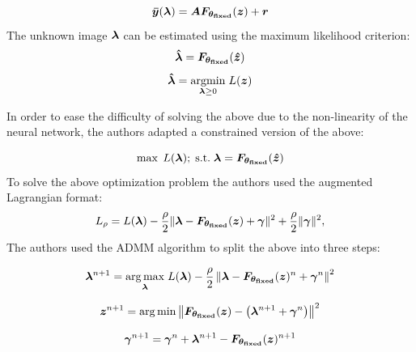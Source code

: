 \begin{equation}\label{eq:mod_PET}
	\bm{\bar{y}}(\bm{\lambda}) = \bm{A} \bm{F}_{\bm{\theta_{\mathrm{fixed}}}}(\bm{z}) + \bm{r}
\end{equation}
The unknown image $\bm{\lambda}$ can be estimated using the maximum likelihood criterion:
\begin{equation}\label{eq:iter_CNN2}
\bm{\hat{\lambda}} = \bm{F}_{\bm{\theta_{\mathrm{fixed}}}}(\bm{\hat{z}})
\end{equation} 
\begin{equation}
\bm{\hat{\lambda}}=\underset{\bm{\lambda} \ge 0}{\operatorname{argmin}} \; L(\bm{z})
\end{equation}

In order to ease the difficulty of solving the above due to the non-linearity of the neural network, the authors adapted a constrained version of the above:

\begin{equation}\label{constr}
 	\operatorname{max} \; L(\bm{\bm{\lambda}});  \; \mathrm{s.t.} \; \bm{\lambda} = \bm{F}_{\bm{\theta_{\mathrm{fixed}}}}(\bm{\hat{z}})
\end{equation}
To solve the above optimization problem the authors used the augmented Lagrangian format:
\begin{equation}
L_{\rho}=L(\bm{\lambda})-\frac{\rho}{2}\|\bm{\lambda}-\bm{F}_{\bm{\theta_{\mathrm{fixed}}}}(\bm{z})+\bm{\gamma}\|^{2}+\frac{\rho}{2}\|\bm{\gamma}\|^{2},
\end{equation}
The authors used the \ac{ADMM} algorithm to split the above into three steps:

\begin{equation}
\bm{\lambda}^{n+1}=\underset{\bm{\lambda}}{\arg \max} \; L(\bm{\lambda})-\frac{\rho}{2}\left\|\bm{\lambda}-\bm{F}_{\bm{\theta_{\mathrm{fixed}}}}(\bm{z})^{n}+\bm{\gamma}^{n}\right\|^{2}
\end{equation}

\begin{equation}
\bm{z}^{n+1}=\arg \min \left\|\bm{F}_{\bm{\theta_{\mathrm{fixed}}}}(\bm{z})-\left(\bm{\lambda}^{n+1}+\bm{\gamma}^{n}\right)\right\|^{2}
\end{equation}

\begin{equation}
\bm{\gamma}^{n+1}=\bm{\gamma}^{n}+\bm{\lambda}^{n+1}-\bm{F}_{\bm{\theta_{\mathrm{fixed}}}}(\bm{z})^{n+1}
\end{equation}


